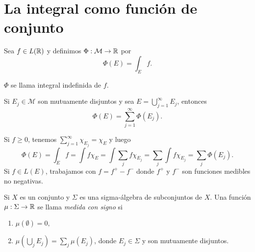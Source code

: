                     \section{La integral como funci\'on de conjunto}
                    
                    
                    
                    Sea $f\in L(\mathbb{R})$ y definimos $\Phi: \mathcal{M} \to \mathbb{R}$
                    por
                    \[
                    \Phi(E)=\int_E f.
                    \]
                    
                    $\Phi$ se llama integral indefinida de $f$.
                    
                    \begin{teorema}{}
                    Si $E_j \in \mathcal{M}$ son mutuamente disjuntos y sea
                    $E=\bigcup\limits_{j=1}^{\infty}E_j$, entonces
                    \[\Phi(E)=\sum\limits_{j=1}^{\infty} \Phi(E_j).\]
                    \end{teorema}
                    
                    \begin{demo}
                    Si $f\geq 0$, tenemos 
                    $\sum\limits_{j=1}^{\infty} \chi_{E_j}=\chi_E$ y luego
                    \[
                    \Phi(E)=\int_E f = \int f \chi_E =\int \sum\limits_j f \chi_{E_j}=\sum\limits_{j} \int f \chi_{E_j}=\sum\limits_j \Phi(E_j).
                    \]
                    Si $f \in L(E)$, trabajamos con  $f=f^{+}-f^{-}$ donde 
                    $f^+$ y $f^-$ son funciones medibles no negativas.
                    \end{demo}
                    
                    \begin{definicion}{}
                    Si $X$ es un conjunto y $\Sigma$ es una sigma-\'algebra de subconjuntos de $X$. 
                    Una funci\'on $\mu:\Sigma \to \mathbb{R}$ se llama \emph{medida con signo} si
                    \begin{enumerate}
                        \item $\mu(\emptyset)=0,$
                        \item $\mu(\bigcup\limits_j E_j) = \sum\limits_j \mu(E_j)$, donde $E_j \in \Sigma$ y son mutuamente disjuntos.
                    \end{enumerate}
                    \end{definicion}
                    
